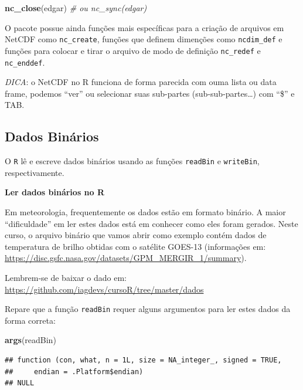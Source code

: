 \documentclass[]{book}
\newenvironment{Shaded}{\begin{snugshade}}{\end{snugshade}}
\newcommand{\KeywordTok}[1]{\textcolor[rgb]{0.13,0.29,0.53}{\textbf{#1}}}
\newcommand{\CommentTok}[1]{\textcolor[rgb]{0.56,0.35,0.01}{\textit{#1}}}
\newcommand{\NormalTok}[1]{#1}
\theoremstyle{definition}
\theoremstyle{definition}
\theoremstyle{definition}
\theoremstyle{remark}
\begin{document}
\begin{Shaded}
\begin{Highlighting}[]
\KeywordTok{nc_close}\NormalTok{(edgar) }\CommentTok{# ou nc_sync(edgar)}
\end{Highlighting}
\end{Shaded}

O pacote possue ainda funções mais específicas para a criação de
arquivos em NetCDF como \texttt{nc\_create}, funções que definem
dimenções como \texttt{ncdim\_def} e funções para colocar e tirar o
arquivo de modo de definição \texttt{nc\_redef} e \texttt{nc\_enddef}.

\emph{DICA}: o NetCDF no R funciona de forma parecida com ouma lista ou
data frame, podemos ``ver'' ou selecionar suas sub-partes
(sub-sub-partes\ldots{}) com ``\$'' e TAB.

\subsection{Dados Binários}\label{dados-binarios}

O \texttt{R} lê e escreve dados binários usando as funções
\texttt{readBin} e \texttt{writeBin}, respectivamente.

\textbf{Ler dados binários no R}

Em meteorologia, frequentemente os dados estão em formato binário. A
maior ``dificuldade'' em ler estes dados está em conhecer como eles
foram gerados. Neste curso, o arquivo binário que vamos abrir como
exemplo contém dados de temperatura de brilho obtidas com o satélite
GOES-13 (informações em:
\url{https://disc.gsfc.nasa.gov/datasets/GPM_MERGIR_1/summary}).

Lembrem-se de baixar o dado em:
\url{https://github.com/iagdevs/cursoR/tree/master/dados}

Repare que a função \texttt{readBin} requer alguns argumentos para ler
estes dados da forma correta:

\begin{Shaded}
\begin{Highlighting}[]
\KeywordTok{args}\NormalTok{(readBin)}
\end{Highlighting}
\end{Shaded}

\begin{verbatim}
## function (con, what, n = 1L, size = NA_integer_, signed = TRUE, 
##     endian = .Platform$endian) 
## NULL
\end{verbatim}
\end{document}
